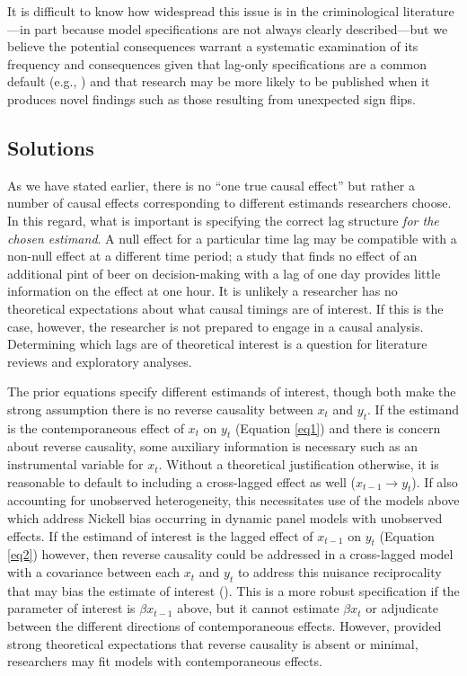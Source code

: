 \documentclass[
  letterpaper,
  DIV=11,
  numbers=noendperiod]{scrartcl}
\begin{document}
It is difficult to know how widespread this issue is in the
criminological literature---in part because model specifications are not
always clearly described---but we believe the potential consequences
warrant a systematic examination of its frequency and consequences given
that lag-only specifications are a common default (e.g.,
) and that research may be more likely to be published when it
produces novel findings such as those resulting from unexpected sign
flips.

\subsection{Solutions}\label{solutions-1}

As we have stated earlier, there is no ``one true causal effect'' but
rather a number of causal effects corresponding to different estimands
researchers choose. In this regard, what is important is specifying the
correct lag structure \emph{for the chosen estimand}. A null effect for
a particular time lag may be compatible with a non-null effect at a
different time period; a study that finds no effect of an additional
pint of beer on decision-making with a lag of one day provides little
information on the effect at one hour. It is unlikely a researcher has
no theoretical expectations about what causal timings are of interest.
If this is the case, however, the researcher is not prepared to engage
in a causal analysis. Determining which lags are of theoretical interest
is a question for literature reviews and exploratory analyses.

The prior equations specify different estimands of interest, though both
make the strong assumption there is no reverse causality between \(x_t\)
and \(y_t\). If the estimand is the contemporaneous effect of \(x_{t}\)
on \(y_t\) (Equation \ref{eq1}) and there is concern about reverse
causality, some auxiliary information is necessary such as an
instrumental variable for \(x_t\). Without a theoretical justification
otherwise, it is reasonable to default to including a cross-lagged
effect as well (\(x_{t-1} \rightarrow y_t\)). If also accounting for
unobserved heterogeneity, this necessitates use of the models above
which address Nickell bias occurring in dynamic panel models with
unobserved effects. If the estimand of interest is the lagged effect of
\(x_{t-1}\) on \(y_t\) (Equation \ref{eq2}) however, then reverse
causality could be addressed in a cross-lagged model with a covariance
between each \(x_t\) and \(y_t\) to address this nuisance reciprocality
that may bias the estimate of interest
(). This is a more robust
specification if the parameter of interest is \(\beta x_{t-1}\) above,
but it cannot estimate \(\beta x_{t}\) or adjudicate between the
different directions of contemporaneous effects. However, provided
strong theoretical expectations that reverse causality is absent or
minimal, researchers may fit models with contemporaneous effects.
\end{document}
